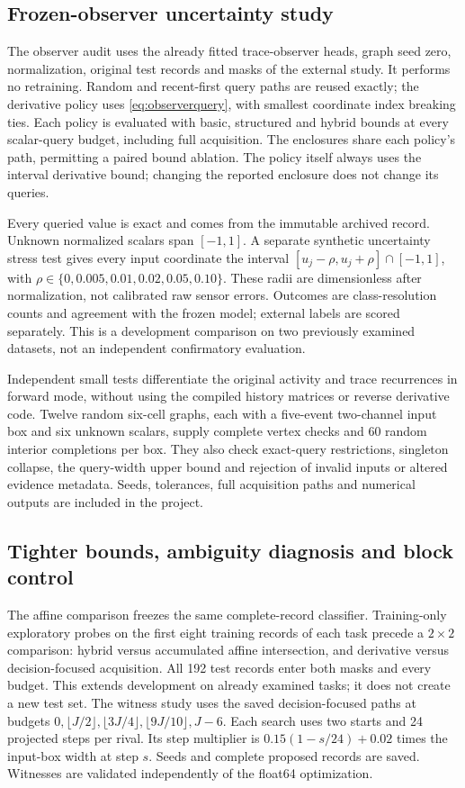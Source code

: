 \documentclass[11pt,a4paper]{article}
\theoremstyle{definition}\newtheorem{definition}[theorem]{Definition}
\begin{document}
\subsection{Frozen-observer uncertainty study}\label{sec:observerprotocol}
The observer audit uses the already fitted trace-observer heads, graph seed zero, normalization, original test records and masks of the external study. It performs no retraining. Random and recent-first query paths are reused exactly; the derivative policy uses \eqref{eq:observerquery}, with smallest coordinate index breaking ties. Each policy is evaluated with basic, structured and hybrid bounds at every scalar-query budget, including full acquisition. The enclosures share each policy's path, permitting a paired bound ablation. The policy itself always uses the interval derivative bound; changing the reported enclosure does not change its queries.

Every queried value is exact and comes from the immutable archived record. Unknown normalized scalars span $[-1,1]$. A separate synthetic uncertainty stress test gives every input coordinate the interval $[u_j-\rho,u_j+\rho]\cap[-1,1]$, with $\rho\in\{0,0.005,0.01,0.02,0.05,0.10\}$. These radii are dimensionless after normalization, not calibrated raw sensor errors. Outcomes are class-resolution counts and agreement with the frozen model; external labels are scored separately. This is a development comparison on two previously examined datasets, not an independent confirmatory evaluation.

Independent small tests differentiate the original activity and trace recurrences in forward mode, without using the compiled history matrices or reverse derivative code. Twelve random six-cell graphs, each with a five-event two-channel input box and six unknown scalars, supply complete vertex checks and 60 random interior completions per box. They also check exact-query restrictions, singleton collapse, the query-width upper bound and rejection of invalid inputs or altered evidence metadata. Seeds, tolerances, full acquisition paths and numerical outputs are included in the project.

\subsection{Tighter bounds, ambiguity diagnosis and block control}
The affine comparison freezes the same complete-record classifier. Training-only exploratory probes on the first eight training records of each task precede a $2\times2$ comparison: hybrid versus accumulated affine intersection, and derivative versus decision-focused acquisition. All 192 test records enter both masks and every budget. This extends development on already examined tasks; it does not create a new test set. The witness study uses the saved decision-focused paths at budgets $0,\lfloor J/2\rfloor,\lfloor3J/4\rfloor,\lfloor9J/10\rfloor,J-6$. Each search uses two starts and 24 projected steps per rival. Its step multiplier is $0.15(1-s/24)+0.02$ times the input-box width at step $s$. Seeds and complete proposed records are saved. Witnesses are validated independently of the float64 optimization.
\end{document}

